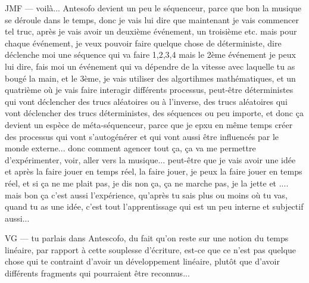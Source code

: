 JMF — voilà... Antesofo devient un peu le séquenceur, parce que bon la musique se déroule dans le temps, donc je vais lui dire que maintenant je vais commencer tel truc, après je vais avoir un deuxième événement, un troisième etc. mais pour chaque événement, je veux pouvoir faire quelque chose de déterministe, dire déclenche moi une séquence qui va faire 1,2,3,4 mais le 2ème événement je peux lui dire, fais moi un événement qui va dépendre de la vitesse avec laquelle tu as bougé la main, et le 3ème, je vais utiliser des algortihmes mathématiques, et un quatrième où je vais faire interagir différents processus, peut-être déterministes qui vont déclencher des trucs aléatoires ou à l'inverse, des trucs aléatoires qui vont déclencher des trucs déterministes, des séquences ou peu importe, et donc ça devient un espèce de méta-séquenceur, parce que je epxu en même temps créer des processus qui vont s'autogénérer et qui vont aussi être influencés par le monde externe... donc comment agencer tout ça, ça va me permettre d'expérimenter, voir, aller vers la musique... peut-être que je vais avoir une idée et après la faire jouer en temps réel, la faire jouer, je peux la faire jouer en temps réel, et si ça ne me plait pas, je dis non ça, ça ne marche pas, je la jette et .... mais bon ça c'est aussi l'expérience, qu'après tu sais plus ou moins où tu vas, quand tu as une idée, c'est tout l'apprentissage qui est un peu interne et subjectif aussi... 

VG — tu parlais dans Antescofo, du fait qu'on reste sur une notion du temps linéaire, par rapport à cette souplesse d'écriture, est-ce que ce n'est pas quelque chose qui te contraint d'avoir un développement linéaire, plutôt que d'avoir différents fragments qui pourraient être reconnus... 

